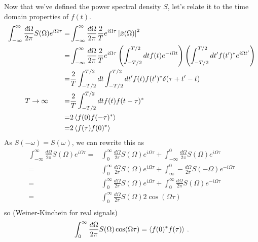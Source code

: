 \documentclass{article}
\begin{document}
Now that we've defined the power spectral density $S$, let's relate it to the time domain properties of $f(t)$.
\begin{align*}
  \int_{-\infty}^\infty \frac{d\Omega}{2\pi} S(\Omega) e^{i \Omega \tau}
  =& \int_{-\infty}^\infty \frac{d\Omega}{2\pi} \frac{2}{T} e^{i \Omega \tau} \left\lvert \tilde{x}(\Omega) \right \rvert^2 \\
  =& \int_{-\infty}^\infty \frac{d\Omega}{2\pi} \frac{2}{T} e^{i \Omega \tau}
    \left( \int_{-T/2}^{T/2} dt f(t) e^{-i \Omega t} \right)
    \left( \int_{-T/2}^{T/2} dt' f(t')^* e^{i \Omega t'} \right) \\
  =& \frac{2}{T} \int_{-T/2}^{T/2} dt \int_{-T/2}^{T/2} dt' f(t) f(t')^* \delta(\tau + t' - t) \\
  T \to \infty \qquad =& \frac{2}{T} \int_{-T/2}^{T/2} dt f(t) f(t - \tau)^* \\
  =& 2 \left \langle f(0)f(-\tau)^* \right \rangle \\
  =& 2 \left \langle f(\tau) f(0)^* \right \rangle
\end{align*}
As $S(-\omega) = S(\omega)$, we can rewrite this as
\begin{align*}
  \int_{-\infty}^\infty \frac{d\Omega}{2\pi} S(\Omega) e^{i \Omega \tau}
  =& \int_0^\infty \frac{d\Omega}{2\pi} S(\Omega) e^{i \Omega \tau} + \int_{-\infty}^0 \frac{d\Omega}{2\pi} S(\Omega) e^{i \Omega \tau} \\
  =& \int_0^\infty \frac{d\Omega}{2\pi} S(\Omega) e^{i \Omega \tau} + \int_{\infty}^0 - \frac{d\Omega}{2\pi} S(-\Omega) e^{-i \Omega \tau} \\
  =& \int_0^\infty \frac{d\Omega}{2\pi} S(\Omega) e^{i \Omega \tau} + \int_0^\infty \frac{d\Omega}{2\pi} S(\Omega) e^{-i \Omega \tau} \\
  =& \int_0^\infty \frac{d\Omega}{2\pi} S(\Omega) 2 \cos(\Omega \tau) \\
\end{align*}
so (Weiner-Kinchein for real signals)
\begin{equation*}
\int_0^\infty \frac{d\Omega}{2\pi} S(\Omega) \cos(\Omega \tau) = \left \langle f(0)^* f(\tau) \right \rangle \, .
\end{equation*}
\end{document}
